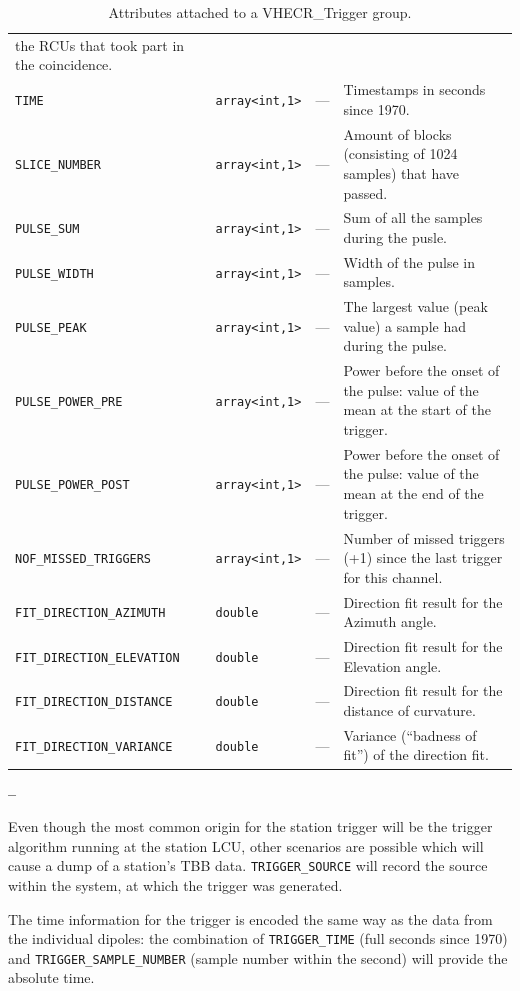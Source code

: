 \documentclass[a4paper,10pt,bibtotoc]{scrartcl}
\begin{document}
\begin{table}[htbp]
\begin{tabular}{|lllp{5.5cm}|}
    the RCUs that took part in the coincidence. \\
    {\small\verb|TIME|} & \verb|array<int,1>| & --- & Timestamps
    in seconds since 1970. \\
    {\small\verb|SLICE_NUMBER|} & \verb|array<int,1>| & --- & Amount of
    blocks (consisting of 1024 samples) that have passed. \\
    {\small\verb|PULSE_SUM|} & \verb|array<int,1>| & --- & Sum of all
    the samples during the pusle. \\
    {\small\verb|PULSE_WIDTH|} & \verb|array<int,1>| & --- & Width of
    the pulse in samples. \\
    {\small\verb|PULSE_PEAK|} & \verb|array<int,1>| & --- & The
    largest value (peak value) a sample had during the pulse. \\
    {\small\verb|PULSE_POWER_PRE|} & \verb|array<int,1>| & --- & Power
    before the onset of the pulse: value of the mean at the start of
    the trigger. \\
    {\small\verb|PULSE_POWER_POST|} & \verb|array<int,1>| & --- & Power
    before the onset of the pulse: value of the mean at the end of
    the trigger. \\
    {\small\verb|NOF_MISSED_TRIGGERS|} & \verb|array<int,1>| & --- & Number of missed
    triggers (+1) since the last trigger for this channel. \\
    {\small\verb|FIT_DIRECTION_AZIMUTH|} & \verb|double| & --- & Direction fit
    result for the Azimuth angle. \\
    {\small\verb|FIT_DIRECTION_ELEVATION|} & \verb|double| & --- & Direction fit 
    result for the Elevation angle. \\
    {\small\verb|FIT_DIRECTION_DISTANCE|} & \verb|double| & --- & Direction fit
    result for the distance of curvature. \\
    {\small\verb|FIT_DIRECTION_VARIANCE|} & \verb|double| & --- & Variance
    (``badness of fit'') of the direction fit. \\
    \hline
  \end{tabular}
  \caption{Attributes attached to a VHECR\_Trigger group.}
\end{table}

\begin{list}{\textbf{--}}{}
\item Even though the most common origin for the station trigger will
  be the trigger algorithm running at the station LCU, other scenarios
  are possible which will cause a dump of a station's TBB data.
  \verb|TRIGGER_SOURCE| will record the source within the system, at
  which the trigger was generated.
\item The time information for the trigger is encoded the same way as
  the data from the individual dipoles: the combination of
  \verb|TRIGGER_TIME| (full seconds since 1970) and
  \verb|TRIGGER_SAMPLE_NUMBER| (sample number within the second) will
  provide the absolute time.
\end{list}
\end{document}
